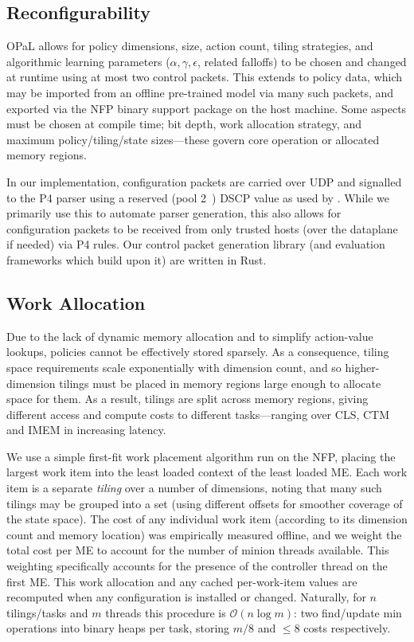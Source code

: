 \documentclass[sigconf,natbib=false]{acmart}
\newcommand{\approachshort}{OPaL}
\begin{document}
\subsection{Reconfigurability}
\approachshort{} allows for policy dimensions, size, action count, tiling strategies, and algorithmic learning parameters ($\alpha, \gamma, \epsilon$, related falloffs) to be chosen and changed at runtime using at most two control packets.
This extends to policy data, which may be imported from an offline pre-trained model via many such packets, and exported via the NFP binary support package on the host machine.
Some aspects must be chosen at compile time; bit depth, work allocation strategy, and maximum policy/tiling/state sizes---these govern core operation or allocated memory regions.

In our implementation, configuration packets are carried over UDP and signalled to the P4 parser using a reserved (pool 2~\parencite{rfc2474}) DSCP value as used by \textcite{DBLP:conf/isca/LiLYCSH19}.
While we primarily use this to automate parser generation, this also allows for configuration packets to be received from only trusted hosts (over the dataplane if needed) via P4 rules.
Our control packet generation library (and evaluation frameworks which build upon it) are written in Rust.

\subsection{Work Allocation}\label{sec:work-allocation}
Due to the lack of dynamic memory allocation and to simplify action-value lookups, policies cannot be effectively stored sparsely.
As a consequence, tiling space requirements scale exponentially with dimension count, and so higher-dimension tilings must be placed in memory regions large enough to allocate space for them.
As a result, tilings are split across memory regions, giving different access and compute costs to different tasks---ranging over CLS, CTM and IMEM in increasing latency.

We use a simple first-fit work placement algorithm run on the NFP, placing the largest work item into the least loaded context of the least loaded ME.
Each work item is a separate \emph{tiling} over a number of dimensions, noting that many such tilings may be grouped into a set (using different offsets for smoother coverage of the state space).
The cost of any individual work item (according to its dimension count and memory location) was empirically measured offline, and we weight the total cost per ME to account for the number of minion threads available.
This weighting specifically accounts for the presence of the controller thread on the first ME.
This work allocation and any cached per-work-item values are recomputed when any configuration is installed or changed.
Naturally, for $n$ tilings/tasks and $m$ threads this procedure is $\mathcal{O}{\left(n\log{m}\right)}$: two find/update min operations into binary heaps per task, storing $m/8$ and $\le8$ costs respectively.
\end{document}

